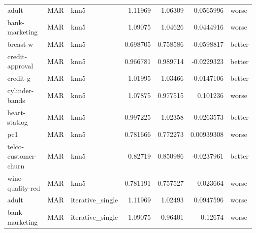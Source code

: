 \begin{table}[ht]
\begin{tabular}{lllrrrl}
 adult                & MAR         & knn5             &                                 1.11969  &                             1.06309  &                     0.0565996  & worse                \\
 bank-marketing       & MAR         & knn5             &                                 1.09075  &                             1.04626  &                     0.0444916  & worse                \\
 breast-w             & MAR         & knn5             &                                 0.698705 &                             0.758586 &                    -0.0598817  & better               \\
 credit-approval      & MAR         & knn5             &                                 0.966781 &                             0.989714 &                    -0.0229323  & better               \\
 credit-g             & MAR         & knn5             &                                 1.01995  &                             1.03466  &                    -0.0147106  & better               \\
 cylinder-bands       & MAR         & knn5             &                                 1.07875  &                             0.977515 &                     0.101236   & worse                \\
 heart-statlog        & MAR         & knn5             &                                 0.997225 &                             1.02358  &                    -0.0263573  & better               \\
 pc1                  & MAR         & knn5             &                                 0.781666 &                             0.772273 &                     0.00939308 & worse                \\
 telco-customer-churn & MAR         & knn5             &                                 0.82719  &                             0.850986 &                    -0.0237961  & better               \\
 wine-quality-red     & MAR         & knn5             &                                 0.781191 &                             0.757527 &                     0.023664   & worse                \\
 adult                & MAR         & iterative\_single &                                 1.11969  &                             1.02493  &                     0.0947596  & worse                \\
 bank-marketing       & MAR         & iterative\_single &                                 1.09075  &                             0.96401  &                     0.12674    & worse                \\

\end{tabular}
\end{table}
